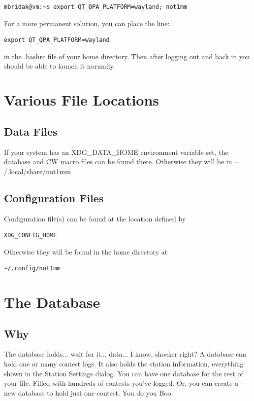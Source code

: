 \documentclass{article}
\begin{document}
\begin{verbatim}
mbridak@vm:~$ export QT_QPA_PLATFORM=wayland; not1mm
\end{verbatim}

\noindent For a more permanent solution, you can place the line:

\begin{verbatim}
export QT_QPA_PLATFORM=wayland
\end{verbatim}

\noindent in the .bashrc file of your home directory. Then after logging out and back in you should be able to launch it normally.

\section{Various File Locations}

\subsection{Data Files}

If your system has an XDG\_DATA\_HOME environment variable set, the database and CW macro files can be found there. Otherwise they will be in $\sim$/.local/share/not1mm

\subsection{Configuration Files}

Configuration file(s) can be found at the location defined by
\begin{verbatim}XDG_CONFIG_HOME\end{verbatim}
Otherwise they will be found in the home directory at \begin{verbatim}~/.config/not1mm\end{verbatim}
\section{The Database}

\subsection{Why}

The database holds... wait for it... data... I know, shocker right? A database can hold one or many contest logs. It also holds the station information, everything shown in the Station Settings dialog. You can have one database for the rest of your life. Filled with hundreds of contests you've logged. Or, you can create a new database to hold just one contest. You do you Boo.
\end{document}
